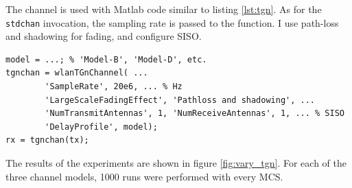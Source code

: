 The channel is used with Matlab code similar to listing \ref{lst:tgn}. As for the \texttt{stdchan} invocation, the sampling rate is passed to the function. I use path-loss and shadowing for fading, and configure \gls{SISO}.

\begin{lstlisting}[captionpos=b,caption={Matlab wlanTGnChannel Simulation},label=lst:tgn]
model = ...; % 'Model-B', 'Model-D', etc.
tgnchan = wlanTGnChannel( ...
        'SampleRate', 20e6, ... % Hz
        'LargeScaleFadingEffect', 'Pathloss and shadowing', ...
        'NumTransmitAntennas', 1, 'NumReceiveAntennas', 1, ... % SISO
        'DelayProfile', model);
rx = tgnchan(tx);
\end{lstlisting}

The results of the experiments are shown in figure \ref{fig:vary_tgn}. For each of the three channel models, 1000 runs were performed with every \gls{MCS}.

